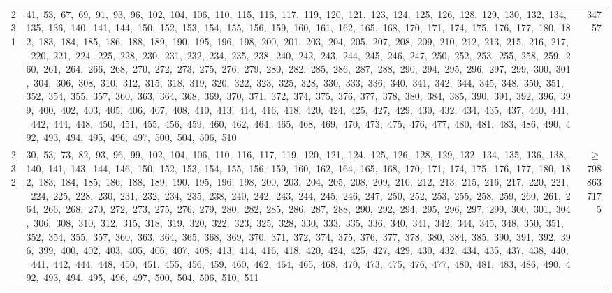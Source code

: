 \begin{longtable}{c|p{}|r}
231 & 41,\ 53,\ 67,\ 69,\ 91,\ 93,\ 96,\ 102,\ 104,\ 106,\ 110,\ 115,\ 116,\ 117,\ 119,\ 120,\ 121,\ 123,\ 124,\ 125,\ 126,\ 128,\ 129,\ 130,\ 132,\ 134,\ 135,\ 136,\ 140,\ 141,\ 144,\ 150,\ 152,\ 153,\ 154,\ 155,\ 156,\ 159,\ 160,\ 161,\ 162,\ 165,\ 168,\ 170,\ 171,\ 174,\ 175,\ 176,\ 177,\ 180,\ 182,\ 183,\ 184,\ 185,\ 186,\ 188,\ 189,\ 190,\ 195,\ 196,\ 198,\ 200,\ 201,\ 203,\ 204,\ 205,\ 207,\ 208,\ 209,\ 210,\ 212,\ 213,\ 215,\ 216,\ 217,\ 220,\ 221,\ 224,\ 225,\ 228,\ 230,\ 231,\ 232,\ 234,\ 235,\ 238,\ 240,\ 242,\ 243,\ 244,\ 245,\ 246,\ 247,\ 250,\ 252,\ 253,\ 255,\ 258,\ 259,\ 260,\ 261,\ 264,\ 266,\ 268,\ 270,\ 272,\ 273,\ 275,\ 276,\ 279,\ 280,\ 282,\ 285,\ 286,\ 287,\ 288,\ 290,\ 294,\ 295,\ 296,\ 297,\ 299,\ 300,\ 301,\ 304,\ 306,\ 308,\ 310,\ 312,\ 315,\ 318,\ 319,\ 320,\ 322,\ 323,\ 325,\ 328,\ 330,\ 333,\ 336,\ 340,\ 341,\ 342,\ 344,\ 345,\ 348,\ 350,\ 351,\ 352,\ 354,\ 355,\ 357,\ 360,\ 363,\ 364,\ 368,\ 369,\ 370,\ 371,\ 372,\ 374,\ 375,\ 376,\ 377,\ 378,\ 380,\ 384,\ 385,\ 390,\ 391,\ 392,\ 396,\ 399,\ 400,\ 402,\ 403,\ 405,\ 406,\ 407,\ 408,\ 410,\ 413,\ 414,\ 416,\ 418,\ 420,\ 424,\ 425,\ 427,\ 429,\ 430,\ 432,\ 434,\ 435,\ 437,\ 440,\ 441,\ 442,\ 444,\ 448,\ 450,\ 451,\ 455,\ 456,\ 459,\ 460,\ 462,\ 464,\ 465,\ 468,\ 469,\ 470,\ 473,\ 475,\ 476,\ 477,\ 480,\ 481,\ 483,\ 486,\ 490,\ 492,\ 493,\ 494,\ 495,\ 496,\ 497,\ 500,\ 504,\ 506,\ 510 & 34757 \\
232 & 30,\ 53,\ 73,\ 82,\ 93,\ 96,\ 99,\ 102,\ 104,\ 106,\ 110,\ 116,\ 117,\ 119,\ 120,\ 121,\ 124,\ 125,\ 126,\ 128,\ 129,\ 132,\ 134,\ 135,\ 136,\ 138,\ 140,\ 141,\ 143,\ 144,\ 146,\ 150,\ 152,\ 153,\ 154,\ 155,\ 156,\ 159,\ 160,\ 162,\ 164,\ 165,\ 168,\ 170,\ 171,\ 174,\ 175,\ 176,\ 177,\ 180,\ 182,\ 183,\ 184,\ 185,\ 186,\ 188,\ 189,\ 190,\ 195,\ 196,\ 198,\ 200,\ 203,\ 204,\ 205,\ 208,\ 209,\ 210,\ 212,\ 213,\ 215,\ 216,\ 217,\ 220,\ 221,\ 224,\ 225,\ 228,\ 230,\ 231,\ 232,\ 234,\ 235,\ 238,\ 240,\ 242,\ 243,\ 244,\ 245,\ 246,\ 247,\ 250,\ 252,\ 253,\ 255,\ 258,\ 259,\ 260,\ 261,\ 264,\ 266,\ 268,\ 270,\ 272,\ 273,\ 275,\ 276,\ 279,\ 280,\ 282,\ 285,\ 286,\ 287,\ 288,\ 290,\ 292,\ 294,\ 295,\ 296,\ 297,\ 299,\ 300,\ 301,\ 304,\ 306,\ 308,\ 310,\ 312,\ 315,\ 318,\ 319,\ 320,\ 322,\ 323,\ 325,\ 328,\ 330,\ 333,\ 335,\ 336,\ 340,\ 341,\ 342,\ 344,\ 345,\ 348,\ 350,\ 351,\ 352,\ 354,\ 355,\ 357,\ 360,\ 363,\ 364,\ 365,\ 368,\ 369,\ 370,\ 371,\ 372,\ 374,\ 375,\ 376,\ 377,\ 378,\ 380,\ 384,\ 385,\ 390,\ 391,\ 392,\ 396,\ 399,\ 400,\ 402,\ 403,\ 405,\ 406,\ 407,\ 408,\ 413,\ 414,\ 416,\ 418,\ 420,\ 424,\ 425,\ 427,\ 429,\ 430,\ 432,\ 434,\ 435,\ 437,\ 438,\ 440,\ 441,\ 442,\ 444,\ 448,\ 450,\ 451,\ 455,\ 456,\ 459,\ 460,\ 462,\ 464,\ 465,\ 468,\ 470,\ 473,\ 475,\ 476,\ 477,\ 480,\ 481,\ 483,\ 486,\ 490,\ 492,\ 493,\ 494,\ 495,\ 496,\ 497,\ 500,\ 504,\ 506,\ 510,\ 511 & $\ge$ 7988637175 \\

\end{longtable}
